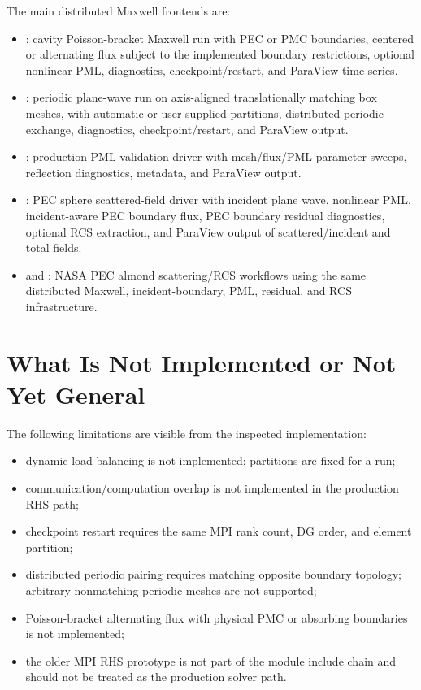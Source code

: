 \documentclass[11pt]{article}
\begin{document}
The main distributed Maxwell frontends are:
\begin{itemize}
  \item {}: cavity
        Poisson-bracket Maxwell run with PEC or PMC boundaries, centered or
        alternating flux subject to the implemented boundary restrictions,
        optional nonlinear PML, diagnostics, checkpoint/restart, and ParaView
        time series.
  \item {}:
        periodic plane-wave run on axis-aligned translationally matching box
        meshes, with automatic or user-supplied partitions, distributed
        periodic exchange, diagnostics, checkpoint/restart, and ParaView
        output.
  \item {}:
        production PML validation driver with mesh/flux/PML parameter sweeps,
        reflection diagnostics, metadata, and ParaView output.
  \item {}: PEC sphere
        scattered-field driver with incident plane wave, nonlinear PML,
        incident-aware PEC boundary flux, PEC boundary residual diagnostics,
        optional RCS extraction, and ParaView output of scattered/incident
        and total fields.
  \item {} and
        :
        NASA PEC almond scattering/RCS workflows using the same distributed
        Maxwell, incident-boundary, PML, residual, and RCS infrastructure.
\end{itemize}

\section{What Is Not Implemented or Not Yet General}

The following limitations are visible from the inspected implementation:
\begin{itemize}
  \item dynamic load balancing is not implemented; partitions are fixed for a
        run;
  \item communication/computation overlap is not implemented in the production
        RHS path;
  \item checkpoint restart requires the same MPI rank count, DG order, and
        element partition;
  \item distributed periodic pairing requires matching opposite boundary
        topology; arbitrary nonmatching periodic meshes are not supported;
  \item Poisson-bracket alternating flux with physical PMC or absorbing
        boundaries is not implemented;
  \item the older  MPI RHS prototype is not part of the
        module include chain and should not be treated as the production
        solver path.
\end{itemize}
\end{document}
